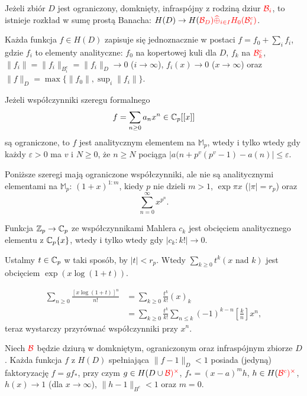 \begin{twierdzenie}
	Jeżeli zbiór $D$ jest ograniczony, domknięty, infraspójny z rodziną dziur $\color{red} \mathcal B_i$, to istnieje rozkład w sumę prostą Banacha: $H(D) \to H(\color{red} \mathcal B_D) \widehat{\oplus}_{i \in I} H_0(\color{red} \mathcal B_i^c)$.

	Każda funkcja $f \in H(D)$ zapisuje się jednoznacznie w postaci $f = f_0 + \sum_i f_i$, gdzie $f_i$ to elementy analityczne: $f_0$ na kopertowej kuli dla $D$, $f_k$ na $\color{red} \mathcal B_k^c$, $\|f_i\| = \|f_i\|_{B^c_i} = \|f_i\|_D \to 0$ ($i \to \infty$), $f_i(x) \to 0$ ($x \to \infty$) oraz $\|f\|_D = \max\{\|f_0\|, \sup_i \|f_i\|\}$.
\end{twierdzenie}

\begin{twierdzenie}
	Jeżeli współczynniki szeregu formalnego 
	\[
		f = \sum_{n \ge 0} a_n x^n \in \mathbb C_p[[x]]
	\]
	są ograniczone, to $f$ jest analitycznym elementem na $\mathbb M_p$, wtedy i tylko wtedy gdy każdy $\varepsilon > 0$ ma $v$ i $N \ge 0$, że $n \ge N$ pociąga $|a(n+p^v(p^v-1) - a(n)| \le \varepsilon$.
\end{twierdzenie}

\begin{przyklad}
	Poniższe szeregi mają ograniczone współczynniki, ale nie są analitycznymi elementami na $\mathbb M_p$: $(1+x)^{1:m}$, kiedy $p$ nie dzieli $m > 1$, $\exp \pi x$ ($|\pi| = r_p$) oraz
	\[
		\sum_{n = 0}^\infty x^{p^n}.
	\]
\end{przyklad}

\begin{fakt}
	Funkcja $\mathbb Z_p \to \mathbb C_p$ ze współczynnikami Mahlera $c_k$ jest obcięciem analitycznego elementu z $\mathbb C_p\{x\}$, wtedy i tylko wtedy gdy $|c_k : k!| \to 0$.
\end{fakt}

\begin{przyklad}
	Ustalmy $t \in \mathbb C_p$ w taki sposób, by $|t| < r_p$.
	Wtedy $\sum_{k \ge 0} t^k (x \textrm{ nad } k)$ jest obcięciem $\exp (x \log (1+t))$.
\end{przyklad}

\begin{wniosek}[z przykładu]
	\begin{align*}
		\sum_{n \ge 0} \frac{[x \log(1+t)]^n}{n!} & = \sum_{k \ge 0} \frac {t^k}{k!}(x)_k \\
		& = \sum_{k \ge 0} \frac{t^k}{k!} \sum_{n \le k} (-1)^{k-n} \left[\frac k n\right] x^n,
	\end{align*}
	teraz wystarczy przyrównać współczynniki przy $x^n$.
\end{wniosek}

\begin{twierdzenie}[Motzkin]
	Niech $\color{red} \mathcal B$ będzie dziurą w domkniętym, ograniczonym oraz infraspójnym zbiorze $D$.
	Każda funkcja $f$ z $H(D)$ spełniająca $\|f - 1 \|_D < 1$ posiada (jedyną) faktoryzację $f = gf_*$, przy czym $g \in H(D \cup \color{red} \mathcal B)^\times$, $f_* = (x-a)^m h$, $h \in H(\color{red} \mathcal B^c)^\times$, $h(x) \to 1$ (dla $x \to \infty$), $\|h - 1\|_{B^c} < 1$ oraz $m = 0$.
\end{twierdzenie}

